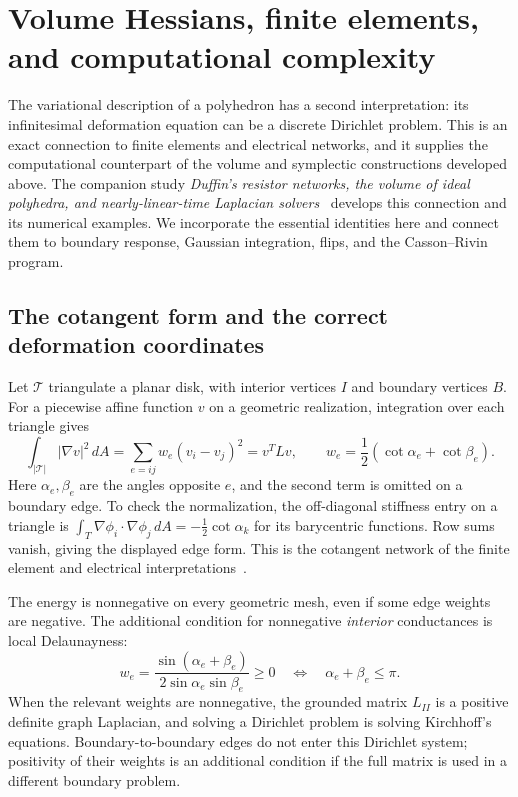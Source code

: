 \section{Volume Hessians, finite elements, and computational complexity}
\label{sec:ipolybridge}

The variational description of a polyhedron has a second interpretation:
its infinitesimal deformation equation can be a discrete Dirichlet
problem. This is an exact connection to finite elements and electrical
networks, and it supplies the computational counterpart of the volume
and symplectic constructions developed above. The companion study
\emph{Duffin's resistor networks, the volume of ideal polyhedra, and
nearly-linear-time Laplacian solvers}~\cite{IpolyStudy} develops this
connection and its numerical examples. We incorporate the essential
identities here and connect them to boundary response, Gaussian
integration, flips, and the Casson--Rivin program.

\subsection{The cotangent form and the correct deformation coordinates}

Let $\mathcal T$ triangulate a planar disk, with interior vertices $I$
and boundary vertices $B$. For a piecewise affine function $v$ on a
geometric realization, integration over each triangle gives
\begin{equation}
 \int_{|\mathcal T|}|\nabla v|^2\,dA
 =\sum_{e=ij}w_e(v_i-v_j)^2=v^TLv,
 \qquad
 w_e=\frac12(\cot\alpha_e+\cot\beta_e).
 \label{eq:ipolyFEM}
\end{equation}
Here $\alpha_e,\beta_e$ are the angles opposite $e$, and the second
term is omitted on a boundary edge. To check the normalization, the
off-diagonal stiffness entry on a triangle is
$\int_T\nabla\phi_i\cdot\nabla\phi_j\,dA=-\tfrac12\cot\alpha_k$
for its barycentric functions. Row sums vanish, giving the displayed
edge form. This is the cotangent network of the finite element and
electrical interpretations~\cite{DuffinNetworks}.

The energy is nonnegative on every geometric mesh, even if some edge
weights are negative. The additional condition for nonnegative
\emph{interior} conductances is local Delaunayness:
\begin{equation}
 w_e=\frac{\sin(\alpha_e+\beta_e)}
              {2\sin\alpha_e\sin\beta_e}\ge0
 \quad\Longleftrightarrow\quad \alpha_e+\beta_e\le\pi.
 \label{eq:ipolyDelaunayweight}
\end{equation}
When the relevant weights are nonnegative, the grounded matrix $L_{II}$
is a positive definite graph Laplacian, and solving a Dirichlet problem
is solving Kirchhoff's equations. Boundary-to-boundary edges do not enter
this Dirichlet system; positivity of their weights is an additional
condition if the full matrix is used in a different boundary problem.


